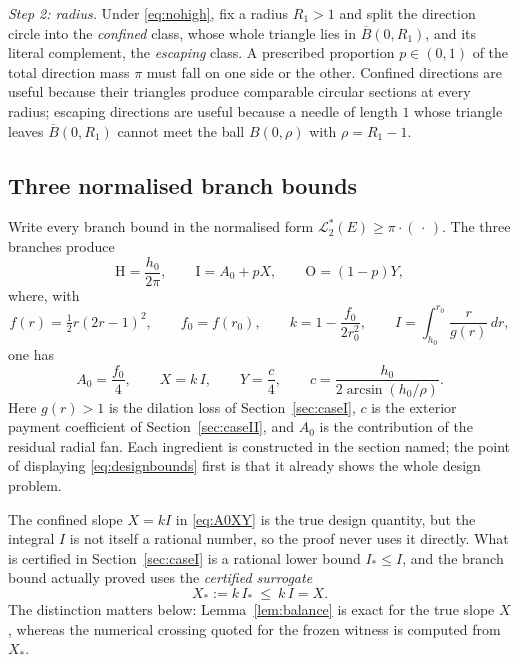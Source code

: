 \documentclass[11pt]{article}
\theoremstyle{plain}
\theoremstyle{definition}
\theoremstyle{remark}
\newcommand{\Lout}{\mathcal{L}^{*}_{2}}
\newcommand{\Istar}{I_{*}}
\begin{document}
\emph{Step 2: radius.} Under \eqref{eq:nohigh}, fix a radius $R_{1}>1$ and split
the direction circle into the \emph{confined} class, whose whole triangle lies in
$\overline B(0,R_{1})$, and its literal complement, the \emph{escaping} class. A
prescribed proportion $p\in(0,1)$ of the total direction mass $\pi$ must fall on
one side or the other. Confined directions are useful because their triangles
produce comparable circular sections at every radius; escaping directions are
useful because a needle of length $1$ whose triangle leaves
$\overline B(0,R_{1})$ cannot meet the ball $B(0,\rho)$ with $\rho=R_{1}-1$.

\subsection{Three normalised branch bounds}\label{sec:designbounds}

Write every branch bound in the normalised form $\Lout(E)\ge\pi\cdot(\,\cdot\,)$.
The three branches produce
\begin{equation}\label{eq:designbounds}
  \mathrm{H}=\frac{h_{0}}{2\pi},
  \qquad
  \mathrm{I}=A_{0}+pX,
  \qquad
  \mathrm{O}=(1-p)Y,
\end{equation}
where, with
\begin{equation}\label{eq:fkdef}
  f(r)=\tfrac12r(2r-1)^{2},
  \qquad
  f_{0}=f(r_{0}),
  \qquad
  k=1-\frac{f_{0}}{2r_{0}^{2}},
  \qquad
  I=\int_{h_{0}}^{r_{0}}\frac{r}{g(r)}\,dr ,
\end{equation}
one has
\begin{equation}\label{eq:A0XY}
  A_{0}=\frac{f_{0}}{4},
  \qquad
  X=k\,I,
  \qquad
  Y=\frac{c}{4},
  \qquad
  c=\frac{h_{0}}{2\arcsin(h_{0}/\rho)} .
\end{equation}
Here $g(r)>1$ is the dilation loss of Section~\ref{sec:caseI}, $c$ is the
exterior payment coefficient of Section~\ref{sec:caseII}, and $A_{0}$ is the
contribution of the residual radial fan. Each ingredient is constructed in the
section named; the point of displaying \eqref{eq:designbounds} first is that it
already shows the whole design problem.

The confined slope $X=kI$ in \eqref{eq:A0XY} is the true design quantity, but
the integral $I$ is not itself a rational number, so the proof never uses it
directly. What is certified in Section~\ref{sec:caseI} is a rational lower bound
$\Istar\le I$, and the branch bound actually proved uses the
\emph{certified surrogate}
\begin{equation}\label{eq:Xsur}
  X_{*}:=k\,\Istar\ \le\ k\,I=X .
\end{equation}
The distinction matters below: Lemma~\ref{lem:balance} is exact for the true
slope $X$, whereas the numerical crossing quoted for the frozen witness is
computed from $X_{*}$.
\end{document}
